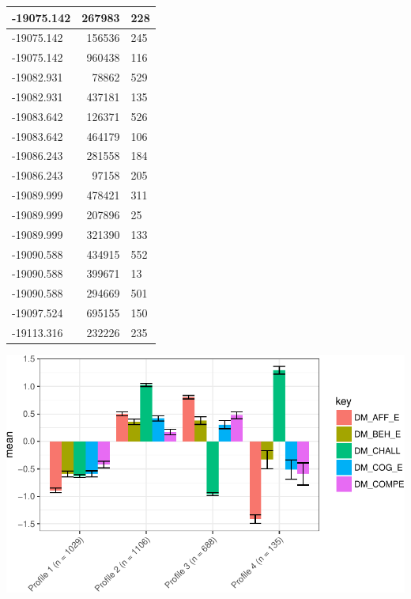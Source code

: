 \documentclass[]{book}
\theoremstyle{definition}
\theoremstyle{definition}
\theoremstyle{definition}
\theoremstyle{remark}
\begin{document}
\begin{tabular}{l|r|l}
\hline
-19075.142 & 267983 & 228\\
\hline
-19075.142 & 156536 & 245\\
\hline
-19075.142 & 960438 & 116\\
\hline
-19082.931 & 78862 & 529\\
\hline
-19082.931 & 437181 & 135\\
\hline
-19083.642 & 126371 & 526\\
\hline
-19083.642 & 464179 & 106\\
\hline
-19086.243 & 281558 & 184\\
\hline
-19086.243 & 97158 & 205\\
\hline
-19089.999 & 478421 & 311\\
\hline
-19089.999 & 207896 & 25\\
\hline
-19089.999 & 321390 & 133\\
\hline
-19090.588 & 434915 & 552\\
\hline
-19090.588 & 399671 & 13\\
\hline
-19090.588 & 294669 & 501\\
\hline
-19097.524 & 695155 & 150\\
\hline
-19113.316 & 232226 & 235\\
\hline
\end{tabular}

\begin{center}\includegraphics[width=0.8\linewidth]{rosenberg-dissertation_files/figure-latex/spec-solutions-model2-4-1} \end{center}
\end{document}
